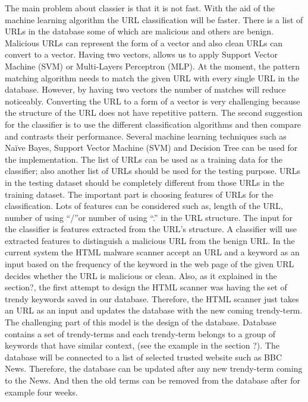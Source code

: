 The main problem about classier is that it is not fast. With the aid of the machine learning algorithm the URL classification will be faster. There is a list of URLs in the database some of which are malicious and others are benign. Malicious URLs can represent the form of a vector and also clean URLs can convert to a vector. Having two vectors, allows us to apply Support Vector Machine (SVM) or Multi-Layers Perceptron (MLP). At the moment, the pattern matching algorithm needs to match the given URL with every single URL in the database. However, by having two vectors the number of matches will reduce noticeably. Converting the URL to a form of a vector is very challenging because the structure of the URL does not have repetitive pattern. 
The second suggestion for the classifier is to use the different classification algorithms and then compare and contrasts their performance. Several machine learning techniques such as Naïve Bayes, Support Vector Machine (SVM) and Decision Tree can be used for the implementation. The list of URLs can be used as a training data for the classifier; also another list of URLs should be used for the testing purpose. URLs in the testing dataset should be completely different from those URLs in the training dataset. The important part is choosing features of URLs for the classification. Lots of features can be considered such as, length of the URL, number of using “/”or number of using “.” in the URL structure. The input for the classifier is features extracted from the URL’s structure. A classifier will use extracted features to distinguish a malicious URL from the benign URL. 
In the current system the HTML malware scanner accept an URL and a keyword as an input based on the frequency of the keyword in the web page of the given URL decides whether the URL is malicious or clean. Also, as it explained in the section?, the first attempt to design the HTML scanner was having the set of trendy keywords saved in our database. Therefore, the HTML scanner just takes an URL as an input and updates the database with the new coming trendy-term. The challenging part of this model is the design of the database. Database contains a set of trendy-terms and each trendy-term belongs to a group of keywords that have similar context, (see the example in the section ?). The database will be connected to a list of selected trusted website such as BBC News. Therefore, the database can be updated after any new trendy-term coming to the News. And then the old terms can be removed from the database after for example four weeks. 
